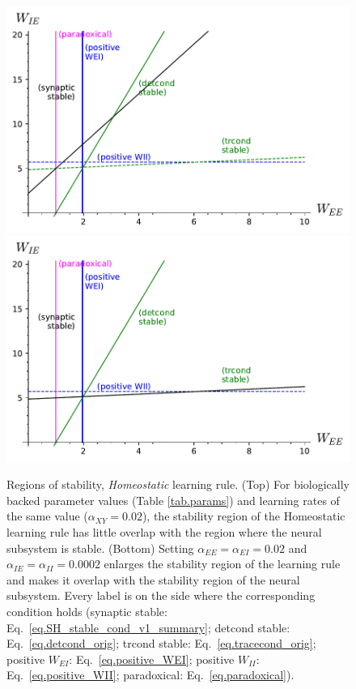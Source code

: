\documentclass[twocolumn]{article}
\newcommand{\EE}{\mathit{EE}}
\newcommand{\EI}{\mathit{EI}}
\newcommand{\IE}{\mathit{IE}}
\newcommand{\II}{\mathit{II}}
\newcommand{\XY}{\mathit{XY}}
\begin{document}
\begin{figure}[!ht]
\centering
\includegraphics[width=\linewidth]{SH_stability}
\includegraphics[width=\linewidth]{SH_stability_slowInh.pdf}
\caption{Regions of stability, {\em Homeostatic} learning rule. (Top) For biologically backed parameter values (Table \ref{tab.params}) and learning rates of the same value ($\alpha_{\XY} = 0.02$), the stability region of the Homeostatic learning rule has little overlap with the region where the neural subsystem is stable. (Bottom) Setting $\alpha_{\EE}=\alpha_{\EI}=0.02$ and $\alpha_{\IE}=\alpha_{\II}=0.0002$ enlarges the stability region of the learning rule and makes it overlap with the stability region of the neural subsystem.
Every label is on the side where the corresponding condition holds (synaptic stable: Eq.\ \ref{eq.SH_stable_cond_v1_summary}; detcond stable: Eq.\ \ref{eq.detcond_orig}; trcond stable: Eq.\ \ref{eq.tracecond_orig}; positive $W_{\EI}$: Eq.\ \ref{eq.positive_WEI}; positive $W_{\II}$: Eq.\ \ref{eq.positive_WII}; paradoxical: Eq.\ \ref{eq.paradoxical}).}
\label{fig.SH_stability}
\end{figure}
\end{document}

